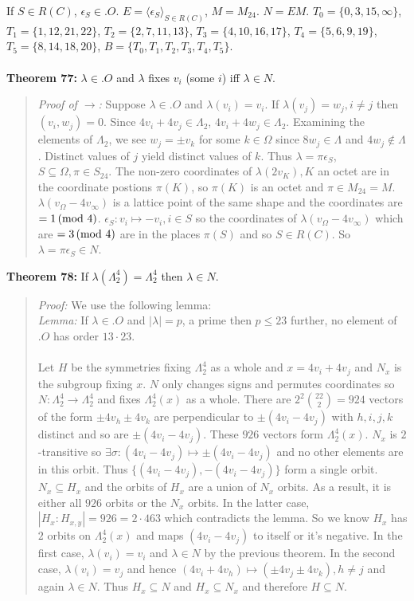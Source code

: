 If $S \in R(C)$, $\epsilon_S \in .O$.
$E= \langle \epsilon_S \rangle_{S \in R(C)}$, $M= M_{24}$.  $N= EM$.
$T_0= \{0, 3, 15, \infty \}$,
$T_1= \{ 1,12,21,22 \}$,
$T_2= \{ 2,7,11,13 \}$,
$T_3= \{ 4,10,16,17 \}$,
$T_4= \{ 5,6,9,19 \}$,
$T_5= \{ 8, 14,18,20 \}$,
$B= \{ T_0, T_1, T_2, T_3, T_4, T_5 \}$.
\\
\\
{\bf Theorem 77:}
$\lambda \in .O$ and $\lambda$ fixes $v_i$ (some $i$) iff $\lambda \in N$.
\begin{quote}
\emph{Proof of $\rightarrow$:}
Suppose $\lambda \in .O$ and $\lambda(v_i)= v_i$.  If $\lambda(v_j)= w_j, i \ne j$ then
$(v_i, w_j)= 0$.  Since $4 v_i + 4 v_j \in \Lambda_2$,
$4 v_i + 4 w_j \in \Lambda_2$.  Examining the elements of $\Lambda_2$, we see
$w_j= \pm v_k$ for some $k \in \Omega$ since $8w_j \in \Lambda$ and $4w_j \notin \Lambda$.
Distinct values of $j$ yield distinct values of $k$.  Thus $\lambda= \pi \epsilon_S$,
$S \subseteq \Omega, \pi \in S_{24}$.  The non-zero coordinates of
$\lambda( 2 v_K ), K $ an octet are in the coordinate postions $\pi(K)$, so
$\pi(K)$ is an octet and  $\pi \in M_{24}=M$.  $\lambda( v_{\Omega} - 4 v_{\infty})$ is
a lattice point of the same shape and the coordinates are $=1 \thinspace \textnormal{(mod } 4 \textnormal{)}$.
$\epsilon_S: v_i \mapsto -v_i, i \in S$ so the coordinates of
$\lambda( v_{\Omega} - 4 v_{\infty})$ which are $= 3 \thinspace \textnormal{(mod } 4 \textnormal{)}$ are in the places
$\pi(S)$ and so $S \in R(C)$.  So $\lambda = \pi \epsilon_S \in N$.
\end{quote}
{\bf Theorem 78:}
If $\lambda(\Lambda_2^4)= \Lambda_2^4$ then
$\lambda \in N$.
\begin{quote}
\emph{Proof:}
We use the following lemma:
\\
\emph{Lemma:} If $\lambda \in .O$ and $|\lambda|= p$, a prime then $p \le 23$ further,
no element of $.O$ has order $13 \cdot 23$.
\\
\\
Let $H$ be the symmetries fixing $\Lambda_2^4$ as a whole and $x= 4v_i +4v_j$
and $N_x$ is the subgroup fixing $x$.  $N$ only changes signs and permutes
coordinates so $N: \Lambda_2^4 \rightarrow \Lambda_2^4$ and fixes
$\Lambda_2^4(x)$ as a whole.  There are $2^2 {22 \choose 2}= 924$ vectors
of the form $\pm 4 v_h \pm 4 v_k$ are perpendicular to 
$\pm(4 v_i - 4 v_j)$ with
$h, i, j,k$ distinct and so are
$\pm(4 v_i - 4 v_j)$.  These $926$ vectors form
$\Lambda_2^4(x)$.  $N_x$ is $2$-transitive so $\exists \sigma: 
(4 v_i - 4 v_j) \mapsto \pm (4 v_i - 4 v_j) $ and no other elements are in this orbit.
Thus $\{ (4 v_i - 4 v_j), -(4 v_i - 4 v_j) \} $ form a single orbit.
$N_x \subseteq H_x$ and the orbits of $H_x$ are a union of $N_x$ orbits.  As a result,
it is either all $926$ orbits or the $N_x$ orbits.  In the latter case,
$|H_x: H_{x,y}| = 926= 2 \cdot 463$ which contradicts the lemma.
So we know $H_x$ has $2$ orbits on $\Lambda_2^4(x)$ and maps 
$(4 v_i - 4 v_j)$ to itself or it's negative.  In the first case, $\lambda(v_i)= v_i$ and
$\lambda \in N$ by the
previous theorem.  In the second case, $\lambda( v_i)= v_j$ and hence
$ (4 v_i + 4 v_h)  \mapsto (\pm 4 v_j \pm 4 v_k) , h \ne j $ and again $\lambda \in N$.  Thus
$H_x \subseteq N$ and $H_x \subseteq N_x$ and therefore $H \subseteq N$.
\end{quote}
